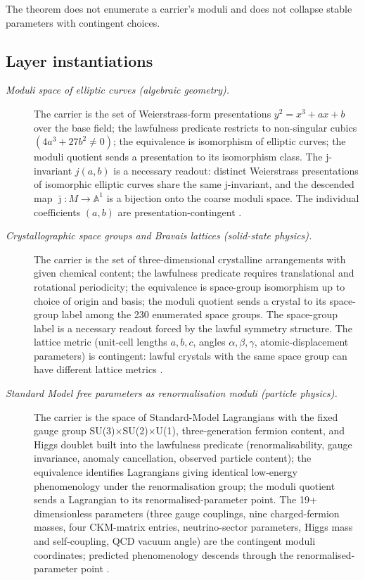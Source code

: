 \documentclass[11pt]{article}
\theoremstyle{definition}
\begin{document}
The theorem does not enumerate a carrier's moduli and does not
collapse stable parameters with contingent choices.

\subsection*{Layer instantiations}\label{layer-inst:F26}

\begin{description}
\item[\emph{Moduli space of elliptic curves (algebraic
geometry).}]
The carrier is the set of Weierstrass-form presentations
\(y^2=x^3+ax+b\) over the base field; the lawfulness
predicate restricts to non-singular cubics
\((4a^3+27b^2\ne 0)\); the equivalence is isomorphism of
elliptic curves; the moduli quotient sends a
presentation to its isomorphism class.  The j-invariant
\(j(a,b)\) is a necessary readout: distinct Weierstrass
presentations of isomorphic elliptic curves share the
same j-invariant, and the descended map
\(\bar\jmath:M\to\mathbb A^1\) is a bijection onto the
coarse moduli space.  The individual coefficients
\((a,b)\) are presentation-contingent
\citep{Mumford1965GIT}.

\item[\emph{Crystallographic space groups and Bravais
lattices (solid-state physics).}]
The carrier is the set of three-dimensional crystalline
arrangements with given chemical content; the lawfulness
predicate requires translational and rotational
periodicity; the equivalence is space-group isomorphism
up to choice of origin and basis; the moduli quotient
sends a crystal to its space-group label among the 230
enumerated space groups.  The space-group label is a
necessary readout forced by the lawful symmetry
structure.  The lattice metric (unit-cell lengths
\(a,b,c\), angles \(\alpha,\beta,\gamma\),
atomic-displacement parameters) is contingent: lawful
crystals with the same space group can have different
lattice metrics \citep{HahnITC2016}.

\item[\emph{Standard Model free parameters as
renormalisation moduli (particle physics).}]
The carrier is the space of Standard-Model Lagrangians
with the fixed gauge group
SU(3)\(\times\)SU(2)\(\times\)U(1), three-generation
fermion content, and Higgs doublet built into the
lawfulness predicate (renormalisability, gauge
invariance, anomaly cancellation, observed particle
content); the equivalence identifies Lagrangians giving
identical low-energy phenomenology under the
renormalisation group; the moduli quotient sends a
Lagrangian to its renormalised-parameter point.  The 19+
dimensionless parameters (three gauge couplings, nine
charged-fermion masses, four CKM-matrix entries,
neutrino-sector parameters, Higgs mass and
self-coupling, QCD vacuum angle) are the contingent
moduli coordinates; predicted phenomenology descends
through the renormalised-parameter point
\citep{Workman2022Review}.


\end{description}
\end{document}
